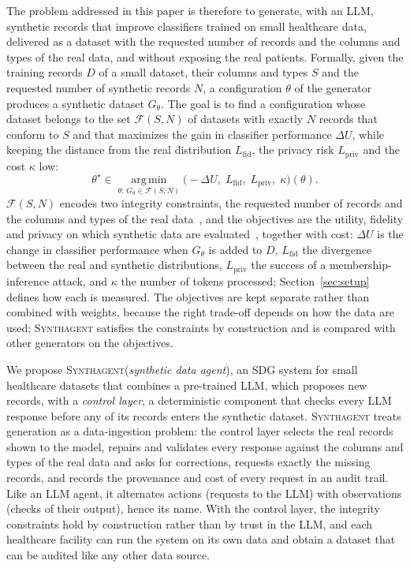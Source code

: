 \documentclass[conference]{IEEEtran}
\newcommand{\system}{\textsc{Synthagent}\xspace}
\begin{document}
The problem addressed in this paper is therefore to generate, with an LLM, synthetic records that improve classifiers trained on small healthcare data, delivered as a dataset with the requested number of records and the columns and types of the real data, and without exposing the real patients. Formally, given the training records $D$ of a small dataset, their columns and types $S$ and the requested number of synthetic records $N$, a configuration $\theta$ of the generator produces a synthetic dataset $G_\theta$. The goal is to find a configuration whose dataset belongs to the set $\mathcal{F}(S,N)$ of datasets with exactly $N$ records that conform to $S$ and that maximizes the gain in classifier performance $\Delta U$, while keeping the distance from the real distribution $L_{\mathrm{fid}}$, the privacy risk $L_{\mathrm{priv}}$ and the cost $\kappa$ low:
\begin{equation}
\theta^{\star}\in\operatorname*{arg\,min}_{\theta:\,G_{\theta}\in\mathcal{F}(S,N)}
\bigl(-\Delta U,\;L_{\mathrm{fid}},\;L_{\mathrm{priv}},\;\kappa\bigr)(\theta).
\label{eq:multiobjective}
\end{equation}
$\mathcal{F}(S,N)$ encodes two integrity constraints, the requested number of records and the columns and types of the real data~\cite{wang1996beyond,batini2009methodologies}, and the objectives are the utility, fidelity and privacy on which synthetic data are evaluated~\cite{qian2023synthcity,lautrup2025syntheval}, together with cost: $\Delta U$ is the change in classifier performance when $G_\theta$ is added to $D$, $L_{\mathrm{fid}}$ the divergence between the real and synthetic distributions, $L_{\mathrm{priv}}$ the success of a membership-inference attack, and $\kappa$ the number of tokens processed; Section~\ref{sec:setup} defines how each is measured. The objectives are kept separate rather than combined with weights, because the right trade-off depends on how the data are used; \system satisfies the constraints by construction and is compared with other generators on the objectives.

We propose \system (\emph{synthetic data agent}), an SDG system for small healthcare datasets that combines a pre-trained LLM, which proposes new records, with a \emph{control layer}, a deterministic component that checks every LLM response before any of its records enters the synthetic dataset. \system treats generation as a data-ingestion problem: the control layer selects the real records shown to the model, repairs and validates every response against the columns and types of the real data and asks for corrections, requests exactly the missing records, and records the provenance and cost of every request in an audit trail. Like an LLM agent, it alternates actions (requests to the LLM) with observations (checks of their output), hence its name. With the control layer, the integrity constraints hold by construction rather than by trust in the LLM, and each healthcare facility can run the system on its own data and obtain a dataset that can be audited like any other data source.
\end{document}
